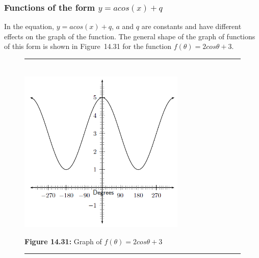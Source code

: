             \subsubsection{ Functions of the form $y=acos\left(x\right)+q$}
            \nopagebreak
        \label{m39414*id87386}In the equation, $y=acos\left(x\right)+q$, $a$ and $q$ are constants and have different effects on the graph of the function. The general shape of the graph of functions of this form is shown in Figure~14.31 for the function $f\left(\theta \right)=2cos\theta +3$.\par 
    \setcounter{subfigure}{0}
	\begin{figure}[H] %
    \begin{center}
    \rule[.1in]{\figurerulewidth}{.005in} \\
        \label{m39414*uid52!!!underscore!!!media}\label{m39414*uid52!!!underscore!!!printimage}\includegraphics[width=300px]{col11306.imgs/m39414_trigrep1.png} %
      \vspace{2pt}
    \vspace{\rubberspace}\par \begin{cnxcaption}
	  \small \textbf{Figure 14.31: }Graph of $f\left(\theta \right)=2cos\theta +3$
	\end{cnxcaption}
    \vspace{.1in}
    \rule[.1in]{\figurerulewidth}{.005in} \\
    \end{center}
 \end{figure}       
\label{m39414*secfhsst!!!underscore!!!id2647}
